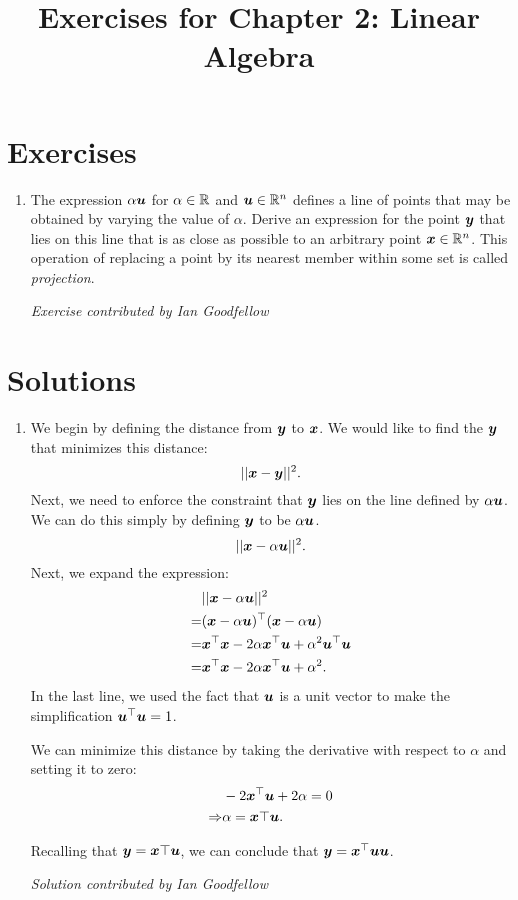 \documentclass{article}
\title{Exercises for Chapter 2: Linear Algebra}
\begin{document}
\maketitle

\section*{Exercises}
\begin{enumerate}
\item The expression $\alpha {\bm{u}}$ for $\alpha \in \mathbb{R}$ and
${\bm{u}} \in \mathbb{R}^n$ defines a line of points that may be obtained by varying the
value of $\alpha$.
Derive an expression for the point ${\bm{y}}$ that lies on this line that is
as close as possible to an arbitrary point ${\bm{x}} \in \mathbb{R}^n$.
This operation of replacing a point by its nearest member within some set
is called {\em projection}.


{\em Exercise contributed by Ian Goodfellow}
\end{enumerate}

\section*{Solutions}
\begin{enumerate}
\item We begin by defining the distance from ${\bm{y}}$ to ${\bm{x}}$. We would like to
find the ${\bm{y}}$ that minimizes this distance:
\begin{equation}
|| {\bm{x}} - {\bm{y}}||^2.
\end{equation}
Next, we need to enforce the constraint that ${\bm{y}}$ lies on the line defined
by $\alpha {\bm{u}}$. We can do this simply by defining ${\bm{y}}$ to be $\alpha {\bm{u}}$.
\begin{equation}
|| {\bm{x}} - \alpha {\bm{u}} ||^2.
\end{equation}
Next, we expand the expression:
\begin{align}
& || {\bm{x}} - \alpha {\bm{u}} ||^2 \\
=& ( {\bm{x}} - \alpha {\bm{u}} )^\top ({\bm{x}} - \alpha {\bm{u}}) \\
=& {\bm{x}}^\top {\bm{x}} - 2 \alpha {\bm{x}}^\top {\bm{u}} + \alpha^2 {\bm{u}}^\top {\bm{u}} \\
=& {\bm{x}}^\top {\bm{x}} - 2 \alpha {\bm{x}}^\top {\bm{u}} + \alpha^2.
\end{align}
In the last line, we used the fact that ${\bm{u}}$ is a unit vector to make
the simplification ${\bm{u}}^\top {\bm{u}} = 1$.

We can minimize this distance by taking the derivative with respect to
$\alpha$ and setting it to zero:
\begin{align}
& - 2  {\bm{x}}^\top {\bm{u}} + 2 \alpha = 0 \\
\Rightarrow & \alpha = {\bm{x}}\top {\bm{u}}.
\end{align}

Recalling that ${\bm{y}} = {\bm{x}}\top {\bm{u}}$, we can conclude that ${\bm{y}} = {\bm{x}}^\top {\bm{u}} {\bm{u}}$.

{\em Solution contributed by Ian Goodfellow}


\end{enumerate}
\end{document}
